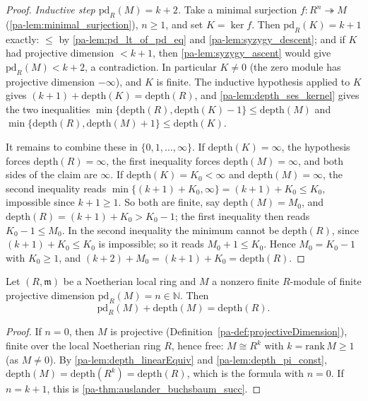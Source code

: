 \begin{proof}
  \emph{Inductive step \(\mathrm{pd}_R(M) = k + 2\).} Take a minimal surjection
  \(f : R^n \twoheadrightarrow M\) (\ref{pa-lem:minimal_surjection}), \(n \geq 1\), and set
  \(K = \ker f\). Then \(\mathrm{pd}_R(K) = k + 1\) exactly: \(\leq\) by
  \ref{pa-lem:pd_lt_of_pd_eq} and \ref{pa-lem:syzygy_descent}; and if \(K\) had projective
  dimension \(< k + 1\), then \ref{pa-lem:syzygy_ascent} would give
  \(\mathrm{pd}_R(M) < k + 2\), a contradiction. In particular \(K \neq 0\) (the zero
  module has projective dimension \(-\infty\)), and \(K\) is finite. The inductive
  hypothesis applied to \(K\) gives
  \((k + 1) + \mathrm{depth}(K) = \mathrm{depth}(R)\), and \ref{pa-lem:depth_ses_kernel}
  gives the two inequalities
  \(\min\{\mathrm{depth}(R), \mathrm{depth}(K) - 1\} \leq \mathrm{depth}(M)\) and
  \(\min\{\mathrm{depth}(R), \mathrm{depth}(M) + 1\} \leq \mathrm{depth}(K)\).

  It remains to combine these in \(\{0, 1, \dots, \infty\}\). If
  \(\mathrm{depth}(K) = \infty\), the hypothesis forces
  \(\mathrm{depth}(R) = \infty\), the first inequality forces
  \(\mathrm{depth}(M) = \infty\), and both sides of the claim are \(\infty\). If
  \(\mathrm{depth}(K) = K_0 < \infty\) and \(\mathrm{depth}(M) = \infty\), the second
  inequality reads \(\min\{(k+1) + K_0, \infty\} = (k+1) + K_0 \leq K_0\), impossible
  since \(k + 1 \geq 1\). So both are finite, say \(\mathrm{depth}(M) = M_0\), and
  \(\mathrm{depth}(R) = (k+1) + K_0 > K_0 - 1\); the first inequality then reads
  \(K_0 - 1 \leq M_0\). In the second inequality the minimum cannot be
  \(\mathrm{depth}(R)\), since \((k+1) + K_0 \leq K_0\) is impossible; so it reads
  \(M_0 + 1 \leq K_0\). Hence \(M_0 = K_0 - 1\) with \(K_0 \geq 1\), and
  \((k + 2) + M_0 = (k + 1) + K_0 = \mathrm{depth}(R)\).
\end{proof}

\begin{theorem}
  \label{pa-thm:auslander_buchsbaum}
  \leanok

  Let \((R, \mathfrak m)\) be a Noetherian local ring and \(M\) a nonzero finite
  \(R\)-module of finite projective dimension \(\mathrm{pd}_R(M) = n \in \mathbb{N}\).
  Then
  \[
    \mathrm{pd}_R(M) + \mathrm{depth}(M) = \mathrm{depth}(R).
  \]
\end{theorem}
\begin{proof}
  \leanok
  If \(n = 0\), then \(M\) is projective (Definition~\ref{pa-def:projectiveDimension}),
  finite over the local Noetherian ring \(R\), hence free: \(M \cong R^{k}\) with
  \(k = \mathrm{rank}\, M \geq 1\) (as \(M \neq 0\)). By \ref{pa-lem:depth_linearEquiv} and
  \ref{pa-lem:depth_pi_const}, \(\mathrm{depth}(M) = \mathrm{depth}(R^k) =
  \mathrm{depth}(R)\), which is the formula with \(n = 0\). If \(n = k + 1\), this is
  \ref{pa-thm:auslander_buchsbaum_succ}.
\end{proof}

